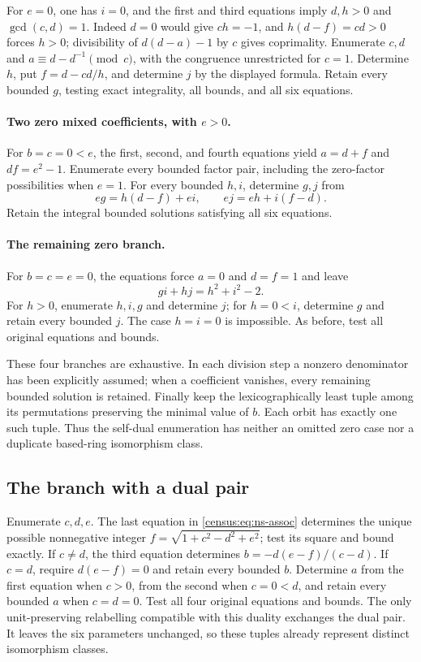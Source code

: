 For $e=0$, one has $i=0$, and the first and third equations imply
$d,h>0$ and $\gcd(c,d)=1$. Indeed $d=0$ would give $ch=-1$,
and $h(d-f)=cd>0$ forces $h>0$; divisibility of $d(d-a)-1$
by $c$ gives coprimality. Enumerate $c,d$ and
$a\equiv d-d^{-1}\pmod c$, with the congruence unrestricted for
$c=1$. Determine $h$, put $f=d-cd/h$, and determine $j$ by the
displayed formula. Retain every bounded $g$, testing exact integrality,
all bounds, and all six equations.

\paragraph{Two zero mixed coefficients, with $e>0$.}
For $b=c=0<e$, the first, second, and fourth equations yield
$a=d+f$ and $df=e^2-1$. Enumerate every bounded factor pair,
including the zero-factor possibilities when $e=1$. For every
bounded $h,i$, determine $g,j$ from
\[
 eg=h(d-f)+ei,\qquad ej=eh+i(f-d).
\]
Retain the integral bounded solutions satisfying all six equations.

\paragraph{The remaining zero branch.}
For $b=c=e=0$, the equations force $a=0$ and $d=f=1$ and leave
\[
 gi+hj=h^2+i^2-2.
\]
For $h>0$, enumerate $h,i,g$ and determine $j$; for $h=0<i$,
determine $g$ and retain every bounded $j$. The case $h=i=0$
is impossible. As before, test all original equations and bounds.

These four branches are exhaustive. In each division step a nonzero
denominator has been explicitly assumed; when a coefficient vanishes,
every remaining bounded solution is retained. Finally keep the
lexicographically least tuple among its permutations preserving the
minimal value of $b$. Each orbit has exactly one such tuple. Thus the
self-dual enumeration has neither an omitted zero case nor a duplicate
based-ring isomorphism class.

\subsection{The branch with a dual pair}
Enumerate $c,d,e$. The last equation in \eqref{census:eq:ns-assoc} determines
the unique possible nonnegative integer
$f=\sqrt{1+c^2-d^2+e^2}$; test its square and bound exactly.
If $c\ne d$, the third equation determines
$b=-d(e-f)/(c-d)$. If $c=d$, require $d(e-f)=0$ and retain
every bounded $b$. Determine $a$ from the first equation when $c>0$,
from the second when $c=0<d$, and retain every bounded $a$ when
$c=d=0$. Test all four original equations and bounds.
The only unit-preserving relabelling compatible with this duality
exchanges the dual pair. It leaves the six parameters unchanged, so
these tuples already represent distinct isomorphism classes.

